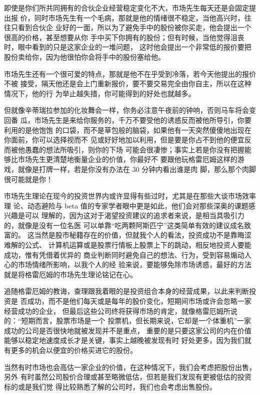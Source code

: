 \documentclass[UTF8,a4paper,zihao=-4,fontset = windows]{ctexart} %
\begin{document}
即使是你们所共同拥有的合伙企业经营稳定变化不大，市场先生每天还是会固定提出报
价，同时市场先生有一个毛病，那就是他的情绪很不稳定，当他高兴时，往往只看到合伙企
业好的一面，所以为了避免手中的股份被你买走，他会提出一个很高的价格，甚至想要从你
手中买下你拥有的股份；但有时候，当他觉得沮丧时，眼中看到的只是这家企业的一堆问题，
这时他会提出一个非常低的报价要把股份卖给你，因为他很怕你会将手中的股份塞给他。

市场先生还有一个很可爱的特点，那就是他不在乎受到冷落，若今天他提出的报价不被
接受，隔天他还是会上门重新报价，要不要交易完全由你自主，所以在这种情况下，他的行
为举止越失措，你可能得到的好处也就越多。

但就像辛蒂瑞拉参加的化妆舞会一样，你务必注意午夜前的钟响，否则马车将会变回番
瓜，市场先生是来给你服务的，千万不要受他的诱惑反而被他所导引，你要利用的是他饱饱
的口袋，而不是草包般的脑袋，如果他有一天突然傻傻地出现在你面前，你可以选择视而不
见或好好地加以利用，但是要是你占不到他的便宜反而被他愚蠢的想法所吸引，则你的下场
可能会很凄惨；事实上若是你没有把握能够比市场先生更清楚地衡量企业的价值，你最好不
要跟他玩格雷厄姆这样的游戏，就像是打牌一样，若是你没有办法在 30 分钟内看出谁是肉
脚，那么那个肉脚很可能就是你！

市场先生理论在现今的投资世界内或许显得有些过时，尤其是在那些大谈市场效率理
论、动态避险与 beta 值的专家学者眼中更是如此，他们会对那些深奥的课题感兴趣是可以
理解的，因为这对于渴望投资建议的追求者来说，是相当具吸引力的，就像是没有一位名医
可以单靠“吃两颗阿斯匹宁”这类简单有效的建议成名致富的。
这当然是股市秘籍存在的价值，但就我个人的看法，投资成功不是靠晦涩难解的公式、
计算机运算或是股票行情板上股票上下的跳动，相反地投资人要能成功，惟有凭借着优异的
商业判断同时避免自己的想法、行为，受到容易煽动人心的市场情绪所影响，以我个人的经
验来说，要能够免除市场诱惑，最好的方法就是将格雷厄姆的市场先生理论铭记在心。

追随格雷厄姆的教诲，查理跟我着眼的是投资组合本身的经营成果，以此来判断投资是
否成功，而不是他们每天或是每年的股价变化，短期间市场或许会忽略一家经营成功的企业，
但最后这些公司终将获得市场的肯定，就像格雷厄姆所说的：“短期而言，股票市场是一个
投票机，但长期来说，它却是一个体重机”一家成功的公司是否很快地就被发现并不是重点，
重要的是只要这家公司的内在价值能够以稳定地速度成长才是关键，事实上越晚被发现有时
好处更多，因为我们就有更多的机会以便宜的价格买进它的股份。

当然有时市场也会高估一家企业的价值，在这种情况下，我们会考虑把股份出售，另外
有时虽然公司股价合理或甚至略微低估，但若是我们发现有更被低估的投资标的或是我们觉
得比较熟悉了解的公司时，我们也会考虑出售股份。
\end{document}
